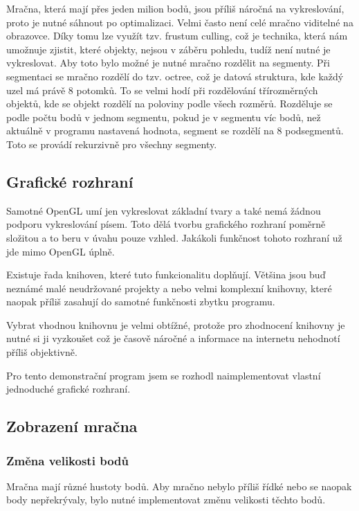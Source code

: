 Mračna, která mají přes jeden milion bodů, jsou příliš náročná na vykreslování, proto je nutné sáhnout po optimalizaci. Velmi často není celé mračno viditelné na obrazovce. Díky tomu lze využít tzv. frustum culling\cite{frustum-culling}, což je technika, která nám umožnuje zjistit, které objekty, nejsou v záběru pohledu, tudíž není nutné je vykreslovat. Aby toto bylo možné je nutné mračno rozdělit na segmenty. Při segmentaci se mračno rozdělí do tzv. octree, což je datová struktura, kde každý uzel má právě 8 potomků. To se velmi hodí při rozdělování třírozměrných objektů, kde se objekt rozdělí na poloviny podle všech rozměrů. Rozděluje se podle počtu bodů v jednom segmentu, pokud je v segmentu víc bodů, než aktuálně v programu nastavená hodnota, segment se rozdělí na 8 podsegmentů. Toto se provádí rekurzivně pro všechny segmenty.

\subsection{Grafické rozhraní}

Samotné OpenGL umí jen vykreslovat základní tvary a také nemá žádnou podporu vykreslování písem. Toto dělá tvorbu grafického rozhraní poměrně složitou a to beru v úvahu pouze vzhled. Jakákoli funkčnost tohoto rozhraní už jde mimo OpenGL úplně.

Existuje řada knihoven, které tuto funkcionalitu doplňují. Většina jsou buď neznámé malé neudržované projekty a nebo velmi komplexní knihovny, které naopak příliš zasahují do samotné funkčnosti zbytku programu.

Vybrat vhodnou knihovnu je velmi obtížné, protože pro zhodnocení knihovny je nutné si ji vyzkoušet což je časově náročné a informace na internetu nehodnotí příliš objektivně.

Pro tento demonstrační program jsem se rozhodl naimplementovat vlastní jednoduché grafické rozhraní.

\subsection{Zobrazení mračna}

\subsubsection{Změna velikosti bodů}

Mračna mají různé hustoty bodů. Aby mračno nebylo příliš řídké nebo se naopak body nepřekrývaly, bylo nutné implementovat změnu velikosti těchto bodů.

